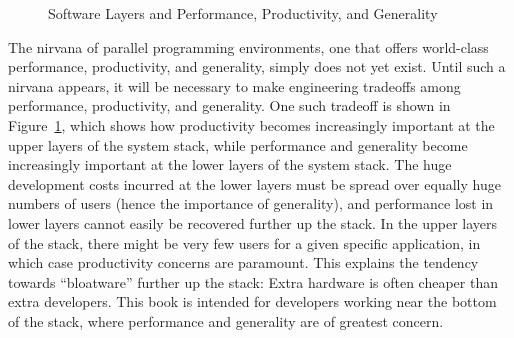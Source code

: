 \begin{figure}
\centering
{}
\caption{Software Layers and Performance, Productivity, and Generality}
\label{fig:intro:Software Layers and Performance, Productivity, and Generality}
\end{figure}

The nirvana of parallel programming environments, one that offers
world-class performance, productivity, and generality, simply does
not yet exist.
Until such a nirvana appears, it will be necessary to make engineering
tradeoffs among performance, productivity, and generality.
One such tradeoff is shown in
Figure~\ref{fig:intro:Software Layers and Performance, Productivity, and Generality},
which shows how productivity becomes increasingly important at the upper layers
of the system stack,
while performance and generality become increasingly important at the
lower layers of the system stack.
The huge development costs incurred at the lower layers
must be spread over equally huge numbers of users
(hence the importance of generality), and
performance lost in lower layers cannot easily be
recovered further up the stack.
In the upper layers of the stack, there might be very few users for a given
specific application, in which case productivity concerns are paramount.
This explains the tendency towards ``bloatware'' further up the stack:
Extra hardware is often cheaper than extra developers.
This book is intended for developers working near the bottom
of the stack, where performance and generality are of greatest concern.

